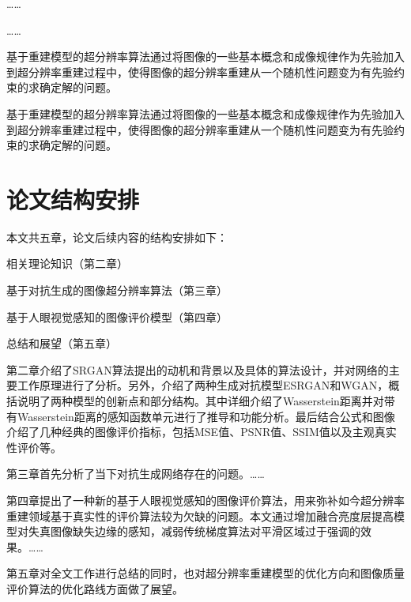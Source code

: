 ……

……

基于重建模型的超分辨率算法通过将图像的一些基本概念和成像规律作为先验加入到超分辨率重建过程中，使得图像的超分辨率重建从一个随机性问题变为有先验约束的求确定解的问题。

基于重建模型的超分辨率算法通过将图像的一些基本概念和成像规律作为先验加入到超分辨率重建过程中，使得图像的超分辨率重建从一个随机性问题变为有先验约束的求确定解的问题。



\vspace*{\baselineskip} 

\section{论文结构安排}

本文共五章，论文后续内容的结构安排如下：

相关理论知识（第二章）

基于对抗生成的图像超分辨率算法（第三章）

基于人眼视觉感知的图像评价模型（第四章）

总结和展望（第五章）

第二章介绍了SRGAN算法提出的动机和背景以及具体的算法设计，并对网络的主要工作原理进行了分析。另外，介绍了两种生成对抗模型ESRGAN和WGAN，概括说明了两种模型的创新点和部分结构。其中详细介绍了Wasserstein距离并对带有Wasserstein距离的感知函数单元进行了推导和功能分析。最后结合公式和图像介绍了几种经典的图像评价指标，包括MSE值、PSNR值、SSIM值以及主观真实性评价等。


第三章首先分析了当下对抗生成网络存在的问题。……

第四章提出了一种新的基于人眼视觉感知的图像评价算法，用来弥补如今超分辨率重建领域基于真实性的评价算法较为欠缺的问题。本文通过增加融合亮度层提高模型对失真图像缺失边缘的感知，减弱传统梯度算法对平滑区域过于强调的效果。……

第五章对全文工作进行总结的同时，也对超分辨率重建模型的优化方向和图像质量评价算法的优化路线方面做了展望。